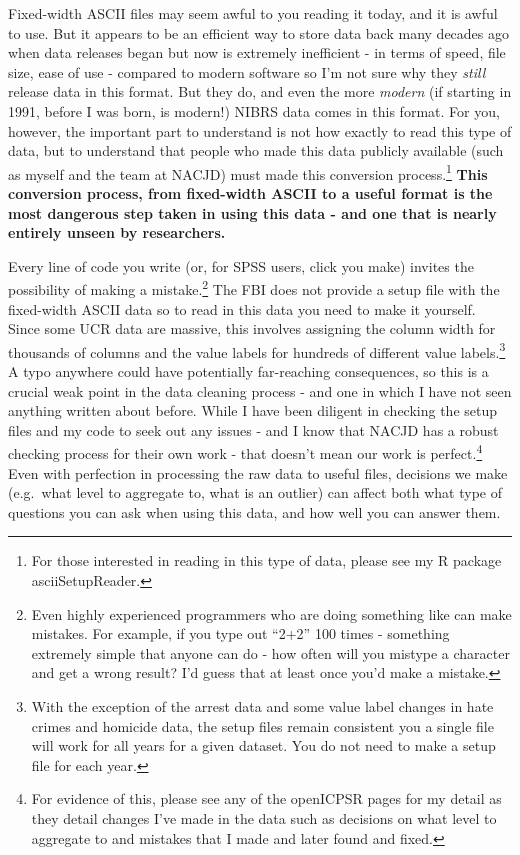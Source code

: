 \documentclass[
  12pt,
  openany]{book}
\begin{document}
Fixed-width ASCII files may seem awful to you reading it today, and it is awful to use. But it appears to be an efficient way to store data back many decades ago when data releases began but now is extremely inefficient - in terms of speed, file size, ease of use - compared to modern software so I'm not sure why they \emph{still} release data in this format. But they do, and even the more \emph{modern} (if starting in 1991, before I was born, is modern!) NIBRS data comes in this format. For you, however, the important part to understand is not how exactly to read this type of data, but to understand that people who made this data publicly available (such as myself and the team at NACJD) must made this conversion process.\footnote{For those interested in reading in this type of data, please see my R package asciiSetupReader.} \textbf{This conversion process, from fixed-width ASCII to a useful format is the most dangerous step taken in using this data - and one that is nearly entirely unseen by researchers.}

Every line of code you write (or, for SPSS users, click you make) invites the possibility of making a mistake.\footnote{Even highly experienced programmers who are doing something like can make mistakes. For example, if you type out ``2+2'' 100 times - something extremely simple that anyone can do - how often will you mistype a character and get a wrong result? I'd guess that at least once you'd make a mistake.} The FBI does not provide a setup file with the fixed-width ASCII data so to read in this data you need to make it yourself. Since some UCR data are massive, this involves assigning the column width for thousands of columns and the value labels for hundreds of different value labels.\footnote{With the exception of the arrest data and some value label changes in hate crimes and homicide data, the setup files remain consistent you a single file will work for all years for a given dataset. You do not need to make a setup file for each year.} A typo anywhere could have potentially far-reaching consequences, so this is a crucial weak point in the data cleaning process - and one in which I have not seen anything written about before. While I have been diligent in checking the setup files and my code to seek out any issues - and I know that NACJD has a robust checking process for their own work - that doesn't mean our work is perfect.\footnote{For evidence of this, please see any of the openICPSR pages for my detail as they detail changes I've made in the data such as decisions on what level to aggregate to and mistakes that I made and later found and fixed.} Even with perfection in processing the raw data to useful files, decisions we make (e.g.~what level to aggregate to, what is an outlier) can affect both what type of questions you can ask when using this data, and how well you can answer them.
\end{document}
